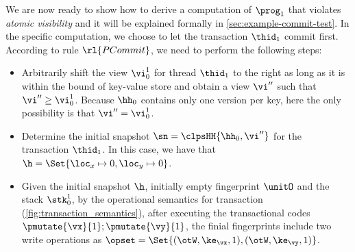 We are now ready to show how to derive a computation of $\prog_1$ that violates \emph{atomic visibility} and it will be explained formally in \cref{sec:example-commit-test}.
In the specific computation, we choose to let the transaction $\thid_1$ commit first.
According to rule $\rl{PCommit}$, we need to perform the following steps: 
\begin{itemize}
\item
Arbitrarily shift the view $\vi_{0}^{1}$ for thread $\thid_1$ to the right as long as it is within the bound of key-value store and obtain a view \(\vi'' \) such that \( \vi'' \geq \vi_{0}^{1} \). 
Because $\hh_0$ contains only one version per key, here the only possibility is that $\vi'' = \vi_{0}^{1}$.
\item
Determine the initial snapshot $\sn = \clpsHH{\hh_0, \vi''}$ for the transaction $\thid_1$.
In this case, we have that $\h = \Set{\loc_x \mapsto 0, \loc_y \mapsto 0}$.
\item 
Given the initial snapshot \( \h \), initially empty fingerprint \( \unitO \) and the stack \( \stk_{0}^{1}\), by the operational semantics for transaction (\cref{fig:transaction_semantics}), after executing the transactional codes \( \pmutate{\vx}{1}; \pmutate{\vy}{1} \), the finial fingerprints include two write operations as $\opset = \Set{(\otW, \ke_{\vx}, 1), (\otW, \ke_{\vy}, 1)}$.

\end{itemize}
